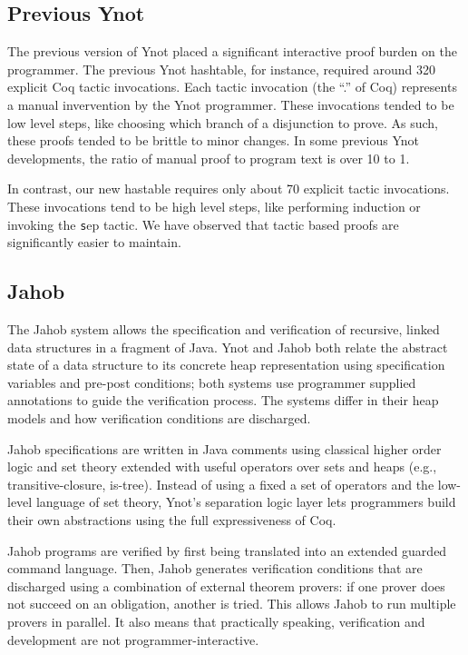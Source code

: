 \documentclass[preprint,nocopyrightspace]{sigplanconf}
\begin{document}
{\subsection{Previous Ynot}

The previous version of Ynot placed a significant interactive proof burden on the programmer.  
The previous Ynot hashtable, for instance, required around 320 explicit Coq tactic invocations.
Each tactic invocation (the ``.'' of Coq) represents a manual invervention by the
Ynot programmer.  These invocations tended to be low level steps, like choosing which
branch of a disjunction to prove.  As such, these proofs tended to be brittle to minor changes.
In some previous Ynot developments, the ratio of manual proof to program text is over 10 to 1.

In contrast, our new hastable requires only about 70 explicit tactic invocations. 
These invocations tend to be high level steps, like performing induction or
invoking the {\texttt sep} tactic.  We have observed that tactic based proofs
are significantly easier to maintain.  

\subsection{Jahob}

The Jahob system allows the specification and verification 
of recursive, linked data structures in a fragment of Java.  Ynot and Jahob 
both relate the abstract state of a data structure to its concrete heap representation
using specification variables and pre-post conditions; both systems use
programmer supplied annotations to guide the verification process.  The systems 
differ in their heap models and how verification conditions are discharged.

Jahob specifications are written in Java comments using classical higher order
logic and set theory extended with useful operators over sets and heaps (e.g., 
transitive-closure, is-tree).  Instead of using a fixed a set of operators and
the low-level language of set theory, Ynot's separation logic layer lets 
programmers build their own abstractions using the full expressiveness of Coq.  
 
Jahob programs are verified by first being translated into an extended guarded command language.
Then, Jahob generates verification conditions 
 that are discharged using a combination of external theorem provers: if one prover does not succeed 
on an obligation, another is tried.  This allows Jahob to run multiple
provers in parallel.  It also means that practically speaking, verification 
and development are not programmer-interactive.

}
\end{document}
